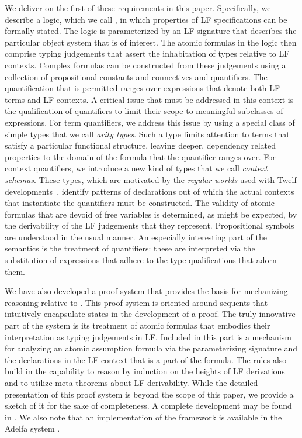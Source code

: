 We deliver on the first of these requirements in this paper.
%
Specifically, we describe a logic, which we call \logic, in which
properties of LF specifications can be formally stated.
%
The logic is parameterized by an LF signature that describes the
particular object system that is of interest.
%
The atomic formulas in the logic then comprise typing judgements that
assert the inhabitation of types relative to LF contexts.
%
Complex formulas can be constructed from these judgements using a
collection of propositional constants and connectives and
quantifiers.
%
The quantification that is permitted ranges over expressions that
denote both LF terms and LF contexts.
%
A critical issue that must be addressed in this context is the
qualification of quantifiers to limit their scope to meaningful
subclasses of expressions.
%
For term quantifiers, we address this issue by using a special class
of simple types that we call \emph{arity types}.
%
Such a type limits attention to terms that satisfy a particular functional
structure, leaving deeper, dependency related properties to the domain
of the formula that the quantifier ranges over.
%
For context quantifiers, we introduce a new kind of types that we call
\emph{context schemas}.
%
These types, which are motivated by the \emph{regular worlds} used
with Twelf developments~\cite{Pfenning02guide,schurmann00phd},
identify patterns of declarations out of which the actual contexts
that instantiate the quantifiers must be constructed.
%
The validity of atomic formulas that are devoid of free variables is
determined, as might be expected, by the derivability of the LF
judgements that they represent.
%
Propositional symbols are understood in the usual manner.
%
An especially interesting part of the semantics is the treatment of
quantifiers: these are interpreted via the substitution of expressions
that adhere to the type qualifications that adorn them.

We have also developed a proof system that provides the basis
for mechanizing reasoning relative to \logic. 
%
This proof system is oriented around sequents that intuitively
encapsulate states in the development of a proof.
%
The truly innovative part of the system is its treatment of atomic
formulas that embodies their interpretation as typing judgements in LF.
%
Included in this part is a mechanism for analyzing
an atomic assumption formula via the parameterizing signature and the
declarations in the LF context that is a part of the formula.
%
The rules also build in the capability to reason by induction on the
heights of LF derivations and to utilize meta-theorems about LF
derivability.
%
While the detailed presentation of this proof system is beyond the scope of
this paper, we provide a sketch of it for the sake of completeness. 
%
A complete development may be found in \cite{nadathur21arxiv,southern21phd}.
%
We also note that an implementation of the framework is available in
the Adelfa system \cite{adelfa.website,southern21lfmtp}.

